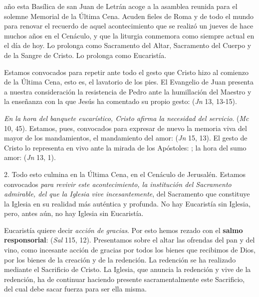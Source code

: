 \begin{body}
 año esta Basílica de san Juan de Letrán acoge a la asamblea reunida para el solemne Memorial de la Última Cena. Acuden fieles de Roma y de todo el mundo para renovar el recuerdo de aquel acontecimiento que se realizó un jueves de hace muchos años en el Cenáculo, y que la liturgia conmemora como siempre actual en el día de hoy. Lo prolonga como Sacramento del Altar, Sacramento del Cuerpo y de la Sangre de Cristo. Lo prolonga como Eucaristía.

Estamos convocados para repetir ante todo el gesto que Cristo hizo al comienzo de la Última Cena, esto es, el lavatorio de los pies. El Evangelio de Juan presenta a nuestra consideración la resistencia de Pedro ante la humillación del Maestro y la enseñanza con la que Jesús ha comentado su propio gesto:  (\textit{Jn} 13, 13-15).

\textit{En la hora del banquete eucarístico, Cristo afirma la necesidad del servicio}.  (\textit{Mc} 10, 45). Estamos, pues, convocados para expresar de nuevo la memoria viva del mayor de los mandamientos, el mandamiento del amor:  (\textit{Jn} 15, 13). El gesto de Cristo lo representa en vivo ante la mirada de los Apóstoles: ; la hora del sumo amor:  (\textit{Jn} 13, 1).

2. Todo esto culmina en la Última Cena, en el Cenáculo de Jerusalén. Estamos convocados \textit{para revivir este acontecimiento, la institución del Sacramento admirable, del que la Iglesia vive incesantemente}, del Sacramento que constituye la Iglesia en su realidad más auténtica y profunda. No hay Eucaristía sin Iglesia, pero, antes aún, no hay Iglesia sin Eucaristía.

Eucaristía quiere decir \textit{acción de gracias}. Por esto hemos rezado con el \textbf{salmo responsorial}:  (\textit{Sal} 115, 12). Presentamos sobre el altar las ofrendas del pan y del vino, como incesante acción de gracias por todos los bienes que recibimos de Dios, por los bienes de la creación y de la redención. La redención se ha realizado mediante el Sacrificio de Cristo. La Iglesia, que anuncia la redención y vive de la redención, ha de continuar haciendo presente sacramentalmente este Sacrificio, del cual debe sacar fuerza para ser ella misma.


\end{body}
